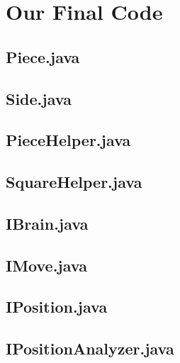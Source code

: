 \documentclass [12pt ,a4paper, english]{scrartcl}
\theoremstyle{plain}
\theoremstyle{definition}
\theoremstyle{remark}
\begin{document}
\section{Our Final Code}

%

\subsection{Piece.java}


\subsection{Side.java}


\subsection{PieceHelper.java}


\subsection{SquareHelper.java}


\subsection{IBrain.java}


\subsection{IMove.java}


\subsection{IPosition.java}


\subsection{IPositionAnalyzer.java}

%
%
%
%
\end{document}
